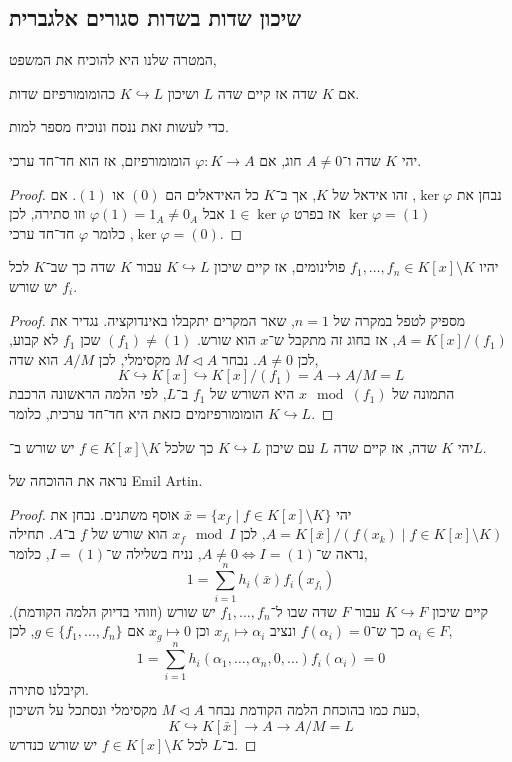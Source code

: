 \subsection{שיכון שדות בשדות סגורים אלגברית}
המטרה שלנו היא להוכיח את המשפט,
\begin{theorem}
	אם $K$ שדה אז קיים שדה $L$ ושיכון $K \hookrightarrow L$ כהומומורפיזם שדות.
\end{theorem}
כדי לעשות זאת ננסח ונוכיח מספר למות.
\begin{lemma}
	יהי $K$ שדה ו־$A \ne 0$ חוג, אם $\varphi : K \to A$ הומומורפיזם, אז הוא חד־חד ערכי.
\end{lemma}
\begin{proof}
	נבחן את $\ker \varphi$, זהו אידאל של $K$, אך ב־$K$ כל האידאלים הם $(0)$ או $(1)$.
	אם $\ker \varphi = (1)$ אז בפרט $1 \in \ker \varphi$  אבל $\varphi(1) = 1_A \ne 0_A$ וזו סתירה, לכן $\ker \varphi = (0)$, כלומר $\varphi$ חד־חד ערכי.
\end{proof}
\begin{lemma}
	יהיו $f_1, \ldots, f_n \in K[x] \setminus K$ פולינומים, אז קיים שיכון $K \hookrightarrow L$ עבור $K$ שדה כך שב־$K$ לכל $f_i$ יש שורש.
\end{lemma}
\begin{proof}
	מספיק לטפל במקרה של $n = 1$, שאר המקרים יתקבלו באינדוקציה.
	נגדיר את $A = K[x] / (f_1)$, אז בחוג זה מתקבל ש־$x$ הוא שורש.
	$(f_1) \ne (1)$ שכן $f_1$ לא קבוע, לכן $A \ne 0$.
	נבחר $M \triangleleft A$ מקסימלי, לכן $A / M$ הוא שדה,
	\[
		K
		\hookrightarrow K[x]
		\hookrightarrow K[x] / (f_1)
		= A
		\to A / M
		= L
	\]
	התמונה של $x \mod (f_1)$ היא השורש של $f_1$ ב־$L$, לפי הלמה הראשונה הרכבת הומומורפיזמים כזאת היא חד־חד ערכית, כלומר $K \hookrightarrow L$.
\end{proof}
\begin{proposition}
	יהי $K$ שדה, אז קיים שדה $L$ עם שיכון $K \hookrightarrow L$ כך שלכל $f \in K[x] \setminus K$ יש שורש ב־$L$.
\end{proposition}
נראה את ההוכחה של Emil Artin.
\begin{proof}
	יהי $\bar{x} = \{ x_f \mid f \in K[x] \setminus K \}$ אוסף משתנים.
	נבחן את $A = K[\bar{x}] / (f(x_k) \mid f \in K[x] \setminus K)$, לכן $x_f \mod I$ הוא שורש של $f$ ב־$A$.
	תחילה נראה ש־$A \ne 0 \iff I = (1)$, נניח בשלילה ש־$I = (1)$, כלומר,
	\[
		1
		= \sum_{i = 1}^n h_i(\bar{x}) f_i(x_{f_i})
	\]
	קיים שיכון $K \hookrightarrow F$ עבור $F$ שדה שבו ל־$f_1, \ldots, f_n$ יש שורש (וזוהי בדיוק הלמה הקודמת).
	$\alpha_i \in F$ כך ש־$f(\alpha_i) = 0$ ונציב $x_{f_i} \mapsto \alpha_i$ וכן $x_g \mapsto 0$ אם $g \in \{ f_1, \ldots, f_n \}$, לכן,
	\[
		1
		= \sum_{i = 1}^n h_i(\alpha_1, \ldots, \alpha_n, 0, \ldots) f_i(\alpha_i)
		= 0
	\]
	וקיבלנו סתירה. \\
	כעת כמו בהוכחת הלמה הקודמת נבחר $M \triangleleft A$ מקסימלי ונסתכל על השיכון,
	\[
		K
		\hookrightarrow K[\bar{x}]
		\to A
		\to A / M
		= L
	\]
	ב־$L$ לכל $f \in K[x] \setminus K$ יש שורש כנדרש.
\end{proof}
